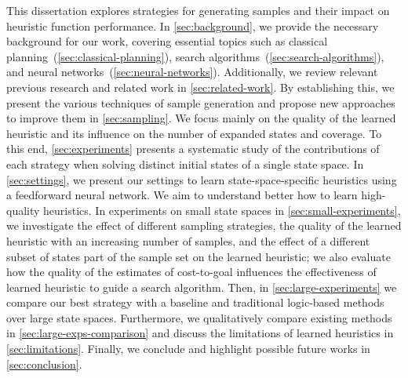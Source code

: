 This dissertation explores strategies for generating samples and their impact on heuristic function performance. In \cref{sec:background}, we provide the necessary background for our work, covering essential topics such as classical planning~(\cref{sec:classical-planning}), search algorithms~(\cref{sec:search-algorithms}), and neural networks~(\cref{sec:neural-networks}). Additionally, we review relevant previous research and related work in \cref{sec:related-work}. By establishing this, we present the various techniques of sample generation and propose new approaches to improve them in \cref{sec:sampling}. We focus mainly on the quality of the learned heuristic and its influence on the number of expanded states and coverage. To this end, \cref{sec:experiments} presents a systematic study of the contributions of each strategy when solving distinct initial states of a single state space. In \cref{sec:settings}, we present our settings to learn state-space-specific heuristics using a feedforward neural network. We aim to understand better how to learn high-quality heuristics. In experiments on small state spaces in \cref{sec:small-experiments}, we investigate the effect of different sampling strategies, the quality of the learned heuristic with an increasing number of samples, and the effect of a different subset of states part of the sample set on the learned heuristic; we also evaluate how the quality of the estimates of cost-to-goal influences the effectiveness of learned heuristic to guide a search algorithm. Then, in \cref{sec:large-experiments} we compare our best strategy with a baseline and traditional logic-based methods over large state spaces. Furthermore, we qualitatively compare existing methods in \cref{sec:large-exps-comparison} and discuss the limitations of learned heuristics in \cref{sec:limitations}. Finally, we conclude and highlight possible future works in \cref{sec:conclusion}.
